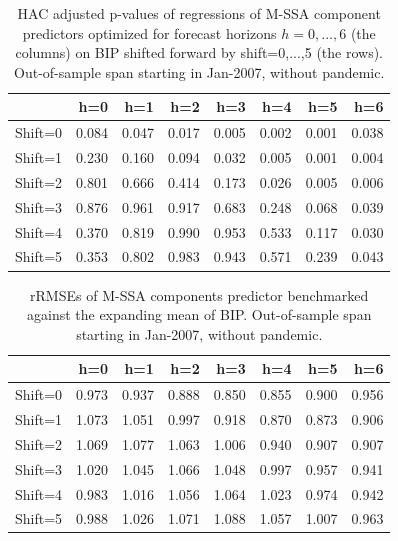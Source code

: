 \documentclass[a4paper]{article}
\begin{document}

\begin{table}[ht]
\centering
\begin{tabular}{rrrrrrrr}
  \hline
 & h=0 & h=1 & h=2 & h=3 & h=4 & h=5 & h=6 \\ 
  \hline
Shift=0 & 0.084 & 0.047 & 0.017 & 0.005 & 0.002 & 0.001 & 0.038 \\ 
  Shift=1 & 0.230 & 0.160 & 0.094 & 0.032 & 0.005 & 0.001 & 0.004 \\ 
  Shift=2 & 0.801 & 0.666 & 0.414 & 0.173 & 0.026 & 0.005 & 0.006 \\ 
  Shift=3 & 0.876 & 0.961 & 0.917 & 0.683 & 0.248 & 0.068 & 0.039 \\ 
  Shift=4 & 0.370 & 0.819 & 0.990 & 0.953 & 0.533 & 0.117 & 0.030 \\ 
  Shift=5 & 0.353 & 0.802 & 0.983 & 0.943 & 0.571 & 0.239 & 0.043 \\ 
   \hline
\end{tabular}
\caption{HAC adjusted p-values of regressions of M-SSA component predictors optimized for forecast horizons $h=0,...,6$  (the columns) on BIP shifted forward by shift=0,...,5 (the rows). Out-of-sample span starting in Jan-2007, without pandemic.} 
\label{p_val_wc}
\end{table}%
\begin{table}[ht]
\centering
\begin{tabular}{rrrrrrrr}
  \hline
 & h=0 & h=1 & h=2 & h=3 & h=4 & h=5 & h=6 \\ 
  \hline
Shift=0 & 0.973 & 0.937 & 0.888 & 0.850 & 0.855 & 0.900 & 0.956 \\ 
  Shift=1 & 1.073 & 1.051 & 0.997 & 0.918 & 0.870 & 0.873 & 0.906 \\ 
  Shift=2 & 1.069 & 1.077 & 1.063 & 1.006 & 0.940 & 0.907 & 0.907 \\ 
  Shift=3 & 1.020 & 1.045 & 1.066 & 1.048 & 0.997 & 0.957 & 0.941 \\ 
  Shift=4 & 0.983 & 1.016 & 1.056 & 1.064 & 1.023 & 0.974 & 0.942 \\ 
  Shift=5 & 0.988 & 1.026 & 1.071 & 1.088 & 1.057 & 1.007 & 0.963 \\ 
   \hline
\end{tabular}
\caption{rRMSEs of M-SSA components predictor benchmarked against the expanding mean of BIP. Out-of-sample span starting in Jan-2007, without pandemic.} 
\label{rRMSE_mSSA_comp_mean_wc}
\end{table}
\end{document}
